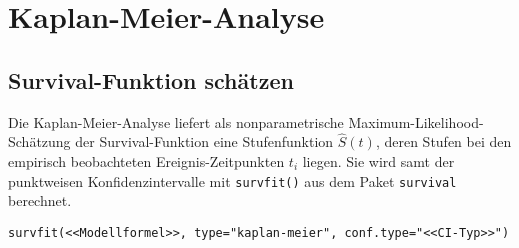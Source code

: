 \section{Kaplan-Meier-Analyse}
\label{sec:survKM}


\subsection{Survival-Funktion schätzen}
\label{sec:survKMfit}

Die Kaplan-Meier-Analyse liefert als nonparametrische Maximum-Likelihood-Schätzung der Survival-Funktion eine Stufenfunktion $\hat{S}(t)$, deren Stufen bei den empirisch beobachteten Ereignis-Zeitpunkten $t_{i}$ liegen. Sie wird samt der punktweisen Konfidenzintervalle mit \lstinline!survfit()! aus dem Paket \lstinline!survival! berechnet.
\begin{lstlisting}
survfit(<<Modellformel>>, type="kaplan-meier", conf.type="<<CI-Typ>>")
\end{lstlisting}


